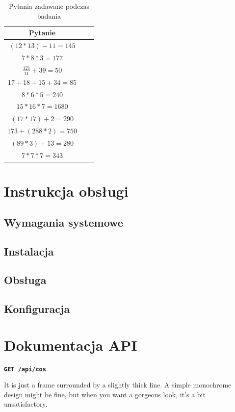 \documentclass{./assets/wfis}
\begin{document}
\begin{table}[h]
    \centering
    \begin{tabular}{|c|c|c|}
        \hline
        Pytanie \\
        \hline
        $(12*13)-11=145$ \\
        $7*8*3=177$ \\
        $\frac{121}{11}+39=50$ \\
        $17+18+15+34=85$ \\
        $8*6*5=240$ \\
        $15*16*7=1680$ \\
        $(17*17)+2=290$ \\
        $173+(288*2)=750$ \\
        $(89*3)+13=280$ \\
        $7*7*7=343$ \\
        \hline
    \end{tabular}
    \caption{Pytania zadawane podczas badania}
    \label{pytania-badania}
\end{table}

\chapter{Instrukcja obsługi}\label{instrukcja}
\section{Wymagania systemowe}
\section{Instalacja}
\section{Obsługa}
\section{Konfiguracja}
\chapter{Dokumentacja API}\label{api}

\begin{boxA}
\textbf{\texttt{GET /api/cos}}

It is just a frame surrounded by a slightly thick line. A simple monochrome design might be fine, but when you want a gorgeous look, it's a bit unsatisfactory.
\end{boxA}

\end{document}

